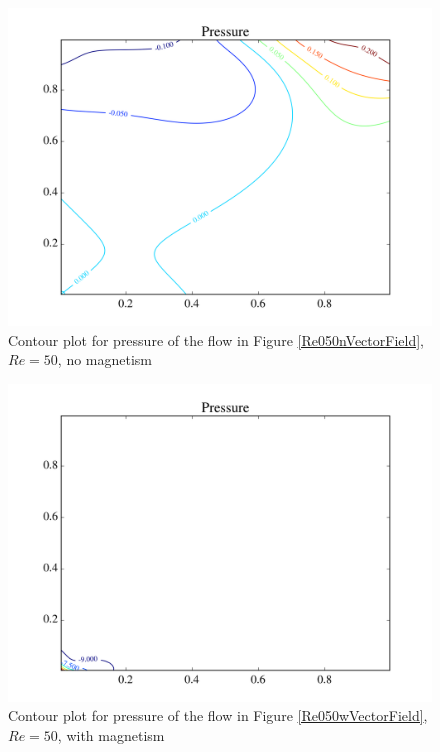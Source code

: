 \documentclass[journal]{IEEEtran}
\begin{document}
\begin{figure}[!t]
\centering
\includegraphics[width=\linewidth]{figures/Re050/n/pressure}
\caption{Contour plot for pressure of the flow in Figure \ref{Re050nVectorField}, $\mathit{Re}=50$, no magnetism\label{Re050nPressure}}
\end{figure}


\begin{figure}[!t]
\centering
\includegraphics[width=\linewidth]{figures/Re050/w/pressure}
\caption{Contour plot for pressure of the flow in Figure \ref{Re050wVectorField}, $\mathit{Re}=50$, with magnetism \label{Re050wPressure}}
\end{figure}
\end{document}
